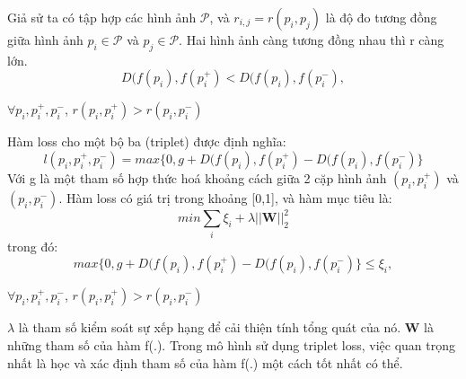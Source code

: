 \documentclass[a4paper,14pt]{extreport}
\begin{document}
Giả sử ta có tập hợp các hình ảnh $\mathcal{P}$, và $r_{i,j} = r(p_i,p_j)$ là độ đo tương đồng giữa hình ảnh $p_i \in \mathcal{P}$ và $p_j \in \mathcal{P}$. Hai hình ảnh càng tương đồng nhau thì r càng lớn.
\[ D(f(p_i),f(p_i^{+}) < D(f(p_i),f(p_i^{-}),\]
\begin{center}$\forall{p_i,p_i^{+},p_i^{-}}$, $r(p_i,p_i^{+}) > r(p_i,p_i^{-})$ \end{center}
Hàm loss cho một bộ ba (triplet) được định nghĩa:
\[l(p_i,p_i^{+},p_i^{-}) = max\{0, g + D(f(p_i),f(p_i^{+}) - D(f(p_i),f(p_i^{-})\}\]
Với g là một tham số hợp thức hoá khoảng cách giữa 2 cặp hình ảnh $(p_i,p_i^{+})$ và $(p_i,p_i^{-})$. Hàm loss có giá trị trong khoảng [0,1], và hàm mục tiêu là:
\[min \sum_{i}\xi_i + \lambda ||\mathbf{W}||_2^2\]
trong đó: \[max\{0, g + D(f(p_i),f(p_i^{+}) - D(f(p_i),f(p_i^{-})\} \leq \xi_i,\]
\begin{center}$\forall{p_i,p_i^{+},p_i^{-}}$, $r(p_i,p_i^{+}) > r(p_i,p_i^{-})$ \end{center}
$\lambda$ là tham số kiểm soát sự xếp hạng để cải thiện tính tổng quát của nó. $\mathbf{W}$ là những tham số của hàm f(.). Trong mô hình sử dụng triplet loss, việc quan trọng nhất là học và xác định tham số của hàm f(.) một cách tốt nhất có thể.
\end{document}
